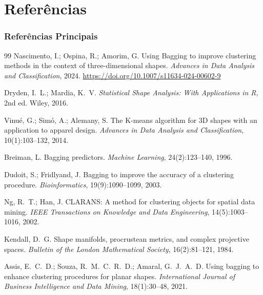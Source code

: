 \documentclass[brazilian,11pt]{beamer}
\begin{document}
\section[Refs]{Referências}

\begin{frame}[allowframebreaks]
    \frametitle{Referências Principais}
    \footnotesize
    \begin{thebibliography}{99}
        Nascimento, I.; Ospina, R.; Amorim, G.
        Using Bagging to improve clustering methods in the context of three-dimensional shapes.
        \textit{Advances in Data Analysis and Classification}, 2024.
        \url{https://doi.org/10.1007/s11634-024-00602-9}

        Dryden, I.\ L.; Mardia, K.\ V.
        \textit{Statistical Shape Analysis: With Applications in R}, 2nd ed.
        Wiley, 2016.

        Vinué, G.; Simó, A.; Alemany, S.
        The K-means algorithm for 3D shapes with an application to apparel design.
        \textit{Advances in Data Analysis and Classification}, 10(1):103--132, 2014.

        Breiman, L.
        Bagging predictors.
        \textit{Machine Learning}, 24(2):123--140, 1996.

        Dudoit, S.; Fridlyand, J.
        Bagging to improve the accuracy of a clustering procedure.
        \textit{Bioinformatics}, 19(9):1090--1099, 2003.

        Ng, R.\ T.; Han, J.
        CLARANS: A method for clustering objects for spatial data mining.
        \textit{IEEE Transactions on Knowledge and Data Engineering}, 14(5):1003--1016, 2002.

        Kendall, D.\ G.
        Shape manifolds, procrustean metrics, and complex projective spaces.
        \textit{Bulletin of the London Mathematical Society}, 16(2):81--121, 1984.

        Assis, E.\ C.\ D.; Souza, R.\ M.\ C.\ R.\ D.; Amaral, G.\ J.\ A.\ D.
        Using bagging to enhance clustering procedures for planar shapes.
        \textit{International Journal of Business Intelligence and Data Mining}, 18(1):30--48, 2021.
    \end{thebibliography}
\end{frame}
\end{document}
